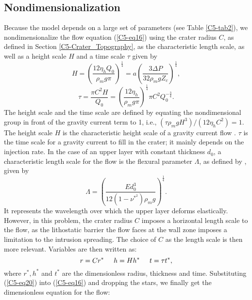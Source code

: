 \subsection{Nondimensionalization}
\label{C5-Dimensionless_Equation}

Because the  model depends  on a  large set  of parameters  (see Table
\ref{C5-tab2}), we nondimensionalize the flow equation (\ref{C5-eq16})
using    the   crater    radius   $C$,    as   defined    in   Section
\ref{C5-Crater_Topography},  as the  characteristic  length scale,  as
well as a height scale $H$ and a time scale $\tau$ given by
\begin{equation}
  \label{C5-eq18}
  H= \left (\frac{12\eta_h Q_{0}}{\rho_{m}g \pi}\right ) ^{\frac{1}{4}}=a\left( \frac{3 \Delta P}{32\rho_{m}gZ_{c}}\right ) ^{\frac{1}{4}},
\end{equation}
\begin{equation}
  \tau=\frac{\pi C^{2} H}{Q_{0}}=\left (\frac{12\eta_h}{\rho_{m}g \pi}\right)^{\frac{1}{4}}\pi C^{2}Q_{0}^{-\frac{
      3}{4}}.\label{C5-eq19}
\end{equation}
The  height scale  and  the time  scale are  defined  by equating  the
nondimensional group in front of the  gravity current term to 1, i.e.,
$(\tau \rho_{m}gH^{3})/(12\eta_h  C^{2})=1$. The height scale  $H$ is the
characteristic   height    scale   of    a   gravity    current   flow
\citep{Huppert:1982a}. $\tau$ is the time  scale for a gravity current
to fill in the crater; it mainly depends on the injection rate. In the
case  of   an  upper   layer  with   constant  thickness   $d_0$,  a
characteristic length  scale for  the flow  is the  flexural parameter
$\Lambda$, as defined by \citet{Turcotte:1982ca}, given by
\begin{equation}
  \Lambda=\left( \frac{E d_0^3}{12 (1-\nu^*^{2})\rho_{m}g} \right )^{\frac{1}{4}}.
  \label{C5-eq99}
\end{equation}
It  represents  the wavelength  over  which  the upper  layer  deforms
elastically. However, in this problem, the crater radius $C$ imposes a
horizontal length  scale to the  flow, as the lithostatic  barrier the
flow faces  at the  wall zone  imposes a  limitation to  the intrusion
spreading.   The choice  of  $C$  as the  length  scale  is then  more
relevant. Variables are then written as:
\begin{equation}
  r=Cr^{*} \hspace{0.5cm}h=Hh^{*} \hspace{0.5cm} t=\tau t^{*} ,
  \label{C5-eq20}
\end{equation}
where  $r^{*},h^{*}$   and  $t^{*}$  are  the   dimensionless  radius,
thickness and time.  Substituting (\ref{C5-eq20}) into (\ref{C5-eq16})
and dropping the stars, we  finally get the dimensionless equation for
the flow:

